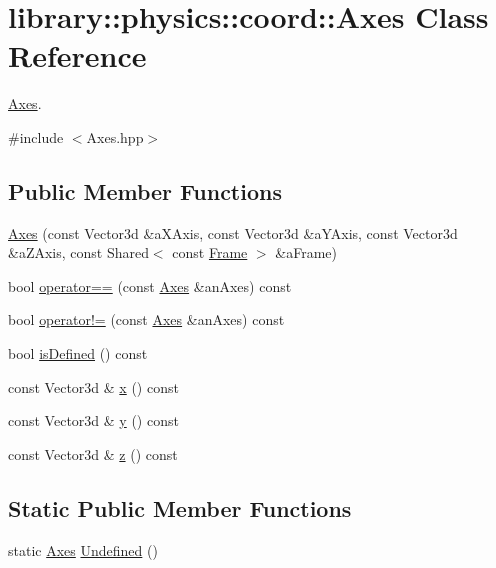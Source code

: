 \hypertarget{classlibrary_1_1physics_1_1coord_1_1_axes}{}\section{library\+:\+:physics\+:\+:coord\+:\+:Axes Class Reference}
\label{classlibrary_1_1physics_1_1coord_1_1_axes}


\hyperlink{classlibrary_1_1physics_1_1coord_1_1_axes}{Axes}.  




{\ttfamily \#include $<$Axes.\+hpp$>$}

\subsection*{Public Member Functions}
\begin{DoxyCompactItemize}
\item 
\hyperlink{classlibrary_1_1physics_1_1coord_1_1_axes_ac4db55f930e0038c8d1e3223d3911952}{Axes} (const Vector3d \&a\+X\+Axis, const Vector3d \&a\+Y\+Axis, const Vector3d \&a\+Z\+Axis, const Shared$<$ const \hyperlink{classlibrary_1_1physics_1_1coord_1_1_frame}{Frame} $>$ \&a\+Frame)
\item 
bool \hyperlink{classlibrary_1_1physics_1_1coord_1_1_axes_ace61547b524226237b377644201f62dd}{operator==} (const \hyperlink{classlibrary_1_1physics_1_1coord_1_1_axes}{Axes} \&an\+Axes) const
\item 
bool \hyperlink{classlibrary_1_1physics_1_1coord_1_1_axes_a7732a78df5a460db8a73deb1d736bcc0}{operator!=} (const \hyperlink{classlibrary_1_1physics_1_1coord_1_1_axes}{Axes} \&an\+Axes) const
\item 
bool \hyperlink{classlibrary_1_1physics_1_1coord_1_1_axes_a5f03439d03d6f22449bdea28e22bb074}{is\+Defined} () const
\item 
const Vector3d \& \hyperlink{classlibrary_1_1physics_1_1coord_1_1_axes_acb94f5b4bc9e6cf628635987cfb9c990}{x} () const
\item 
const Vector3d \& \hyperlink{classlibrary_1_1physics_1_1coord_1_1_axes_ae777cb405641d9f71d07ec706787b217}{y} () const
\item 
const Vector3d \& \hyperlink{classlibrary_1_1physics_1_1coord_1_1_axes_a22fa1ae49680fc2c4e8e7e905e472301}{z} () const
\end{DoxyCompactItemize}
\subsection*{Static Public Member Functions}
\begin{DoxyCompactItemize}
\item 
static \hyperlink{classlibrary_1_1physics_1_1coord_1_1_axes}{Axes} \hyperlink{classlibrary_1_1physics_1_1coord_1_1_axes_ab6ed449d3cdd757a42ba5f987c7d5778}{Undefined} ()
\end{DoxyCompactItemize}
